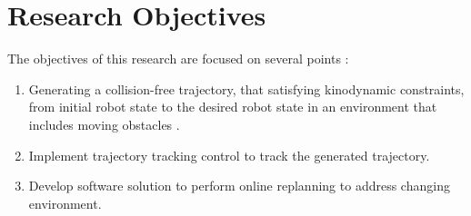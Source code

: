 \documentclass[../thesis.tex]{subfiles}
\begin{document}
\section{Research Objectives}

The objectives of this research are focused on several points :
\begin{enumerate}
\item Generating a collision-free trajectory, that satisfying kinodynamic constraints, from initial robot state to the desired robot state in an environment that includes moving obstacles .
\item Implement trajectory tracking control to track the generated trajectory.
\item Develop software solution to perform online replanning to address changing environment.
\end{enumerate}
\end{document}
